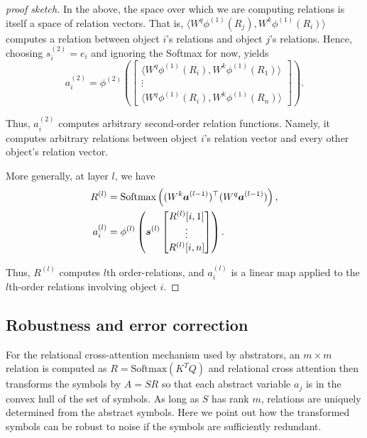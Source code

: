 \begin{proof}[proof sketch]
	In the above, the space over which we are computing relations is itself a space of relation vectors. That is, $\langle W^q \phi^{(1)}(R_j), W^k \phi^{(1)}(R_i) \rangle$ computes a relation between object $i$'s relations and object $j$'s relations. Hence, choosing $s_i^{(2)} = e_i$ and ignoring the Softmax for now, yields
	\begin{equation*}
		a_i^{(2)} = \phi^{(2)}\left(\begin{bmatrix}\langle W^q \phi^{(1)}(R_i), W^k \phi^{(1)}(R_1) \rangle \\ \vdots \\ \langle W^q \phi^{(1)}(R_i), W^k \phi^{(1)}(R_n) \rangle\end{bmatrix}\right).
	\end{equation*}
	
	Thus, $a_i^{(2)}$ computes arbitrary second-order relation functions. Namely, it computes arbitrary relations between object $i$'s relation vector and every other object's relation vector.
	
	More generally, at layer $l$, we have 
	\begin{align*}
		R^{(l)} &= \Softmax\left((W^k \boldsymbol{a}^{(l-1)})^\top (W^q \boldsymbol{a}^{(l-1)})\right),\\
		a_i^{(l)} &= \phi^{(l)}\left(\boldsymbol{s}^{(l)} \begin{bmatrix}R^{(l)}[i,1] \\ \vdots \\ R^{(l)}[i,n]\end{bmatrix}\right).
	\end{align*}
	
	Thus, $R^{(l)}$ computes $l$th order-relations, and $a_i^{(l)}$ is a linear map applied to the $l$th-order relations involving object $i$.
\end{proof}


\subsection{Robustness and error correction}

For the relational cross-attention mechanism used by abstrators, an $m\times m$ relation
is computed as  $R = \mbox{Softmax}(K^T Q)$
and relational cross attention then transforms the symbols by
$A = SR$ so that each abstract variable $a_j$ is in the convex hull of the set of symbols.
As long as $S$ has rank $m$, relations are uniquely determined from the abstract symbols.
Here we point out how the transformed symbols can be robust to noise if the symbols are 
sufficiently redundant.


